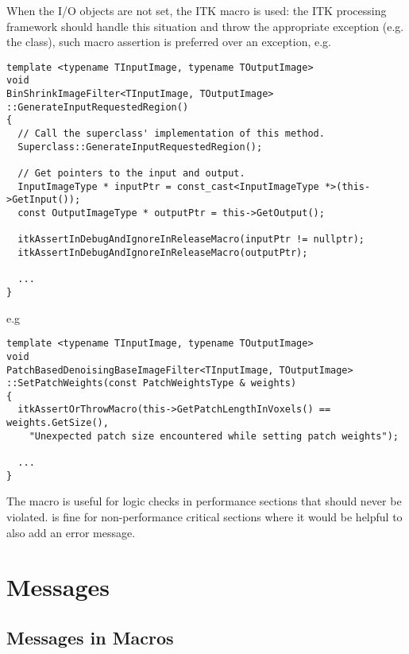 When the I/O objects are not set, the ITK
 macro is used: the ITK processing
framework should handle this situation and throw the appropriate exception (e.g.
the  class), such macro assertion is preferred over
an exception, e.g.

\small
\begin{verbatim}
template <typename TInputImage, typename TOutputImage>
void
BinShrinkImageFilter<TInputImage, TOutputImage>
::GenerateInputRequestedRegion()
{
  // Call the superclass' implementation of this method.
  Superclass::GenerateInputRequestedRegion();

  // Get pointers to the input and output.
  InputImageType * inputPtr = const_cast<InputImageType *>(this->GetInput());
  const OutputImageType * outputPtr = this->GetOutput();

  itkAssertInDebugAndIgnoreInReleaseMacro(inputPtr != nullptr);
  itkAssertInDebugAndIgnoreInReleaseMacro(outputPtr);

  ...
}
\end{verbatim}
\normalsize

e.g

\small
\begin{verbatim}
template <typename TInputImage, typename TOutputImage>
void
PatchBasedDenoisingBaseImageFilter<TInputImage, TOutputImage>
::SetPatchWeights(const PatchWeightsType & weights)
{
  itkAssertOrThrowMacro(this->GetPatchLengthInVoxels() == weights.GetSize(),
    "Unexpected patch size encountered while setting patch weights");

  ...
}
\end{verbatim}
\normalsize

The  macro is useful for logic
checks in performance sections that should never be violated.
 is fine for non-performance critical sections where
it would be helpful to also add an error message.


\section{Messages}
\label{sec:Messages}


\subsection{Messages in Macros}
\label{sec:MessagesInMacros}

